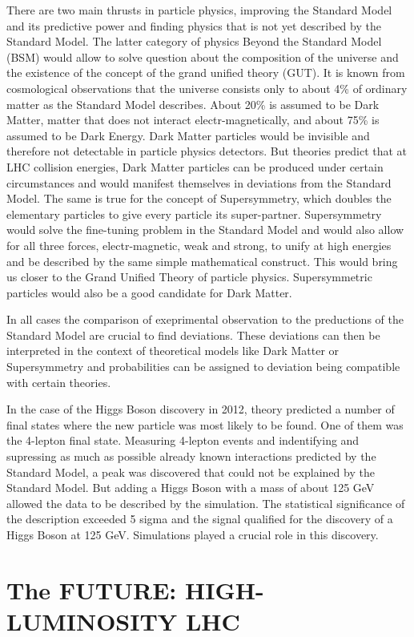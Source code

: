 \documentclass{wscpaperproc}
\theoremstyle{wsc}
\begin{document}
There are two main thrusts in particle physics, improving the Standard Model and its predictive power and finding physics that is not yet described by the Standard Model. The latter category of physics Beyond the Standard Model (BSM) would allow to solve question about the composition of the universe and the existence of the concept of the grand unified theory (GUT). It is known from cosmological observations that the universe consists only to about 4\% of ordinary matter as the Standard Model describes. About 20\% is assumed to be Dark Matter, matter that does not interact electr-magnetically, and about 75\% is assumed to be Dark Energy. Dark Matter particles would be invisible and therefore not detectable in particle physics detectors. But theories predict that at LHC collision energies, Dark Matter particles can be produced under certain circumstances and would manifest themselves in deviations from the Standard Model. The same is true for the concept of Supersymmetry, which doubles the elementary particles to give every particle its super-partner. Supersymmetry would solve the fine-tuning problem in the Standard Model and would also allow for all three forces, electr-magnetic, weak and strong, to unify at high energies and be described by the same simple mathematical construct. This would bring us closer to the Grand Unified Theory of particle physics. Supersymmetric particles would also be a good candidate for Dark Matter.

In all cases the comparison of exeprimental observation to the preductions of the Standard Model are crucial to find deviations. These deviations can then be interpreted in the context of theoretical models like Dark Matter or Supersymmetry and probabilities can be assigned to deviation being compatible with certain theories.

In the case of the Higgs Boson discovery in 2012, theory predicted a number of final states where the new particle was most likely to be found. One of them was the 4-lepton final state. Measuring 4-lepton events and indentifying and supressing as much as possible already known interactions predicted by the Standard Model, a peak was discovered that could not be explained by the Standard Model. But adding a Higgs Boson with a mass of about 125 GeV allowed the data to be described by the simulation. The statistical significance of the description exceeded 5 sigma and the signal qualified for the discovery of a Higgs Boson at 125 GeV. Simulations played a crucial role in this discovery.

\section{The FUTURE: HIGH-LUMINOSITY LHC}
\label{sec:hl-lhc}
\end{document}
